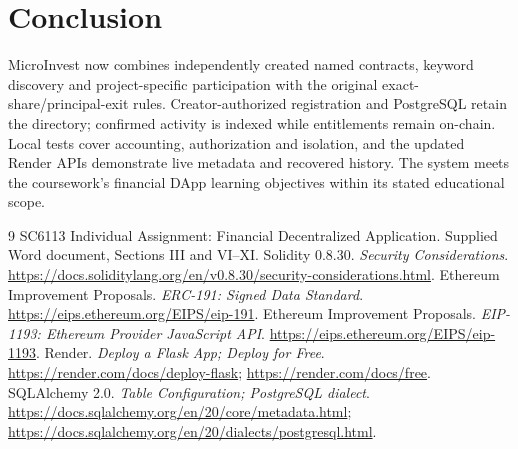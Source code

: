 \documentclass[10pt,a4paper]{article}
\begin{document}
\section{Conclusion}
MicroInvest now combines independently created named contracts, keyword discovery and project-specific participation with the original exact-share/principal-exit rules. Creator-authorized registration and PostgreSQL retain the directory; confirmed activity is indexed while entitlements remain on-chain. Local tests cover accounting, authorization and isolation, and the updated Render APIs demonstrate live metadata and recovered history. The system meets the coursework's financial DApp learning objectives within its stated educational scope.

\begin{thebibliography}{9}\small
\setlength{\itemsep}{1pt}
 SC6113 Individual Assignment: Financial Decentralized Application. Supplied Word document, Sections III and VI--XI.
 Solidity 0.8.30. \emph{Security Considerations}. \url{https://docs.soliditylang.org/en/v0.8.30/security-considerations.html}.
 Ethereum Improvement Proposals. \emph{ERC-191: Signed Data Standard}. \url{https://eips.ethereum.org/EIPS/eip-191}.
 Ethereum Improvement Proposals. \emph{EIP-1193: Ethereum Provider JavaScript API}. \url{https://eips.ethereum.org/EIPS/eip-1193}.
 Render. \emph{Deploy a Flask App; Deploy for Free}. \url{https://render.com/docs/deploy-flask}; \url{https://render.com/docs/free}.
 SQLAlchemy 2.0. \emph{Table Configuration; PostgreSQL dialect}. \url{https://docs.sqlalchemy.org/en/20/core/metadata.html}; \url{https://docs.sqlalchemy.org/en/20/dialects/postgresql.html}.
\end{thebibliography}
\end{document}
